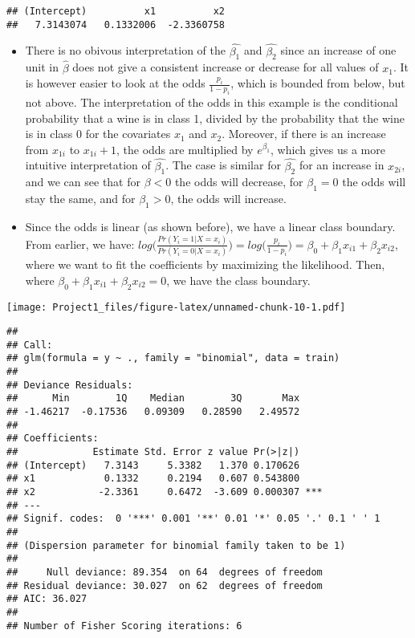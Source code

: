 \documentclass[]{article}
\begin{document}
\begin{verbatim}
## (Intercept)          x1          x2 
##   7.3143074   0.1332006  -2.3360758
\end{verbatim}

\begin{itemize}
\item
  There is no obivous interpretation of the \(\hat{\beta_1}\) and
  \(\hat{\beta_2}\) since an increase of one unit in \(\hat{\beta}\)
  does not give a consistent increase or decrease for all values of
  \(x_1\). It is however easier to look at the odds
  \(\frac{p_i}{1-p_i}\), which is bounded from below, but not above. The
  interpretation of the odds in this example is the conditional
  probability that a wine is in class 1, divided by the probability that
  the wine is in class 0 for the covariates \(x_1\) and \(x_2\).
  Moreover, if there is an increase from \(x_{1i}\) to \(x_{1i} + 1\),
  the odds are multiplied by \(e^{\beta_1}\), which gives us a more
  intuitive interpretation of \(\hat{\beta_1}\). The case is similar for
  \(\hat{\beta_2}\) for an increase in \(x_{2i}\), and we can see that
  for \(\beta < 0\) the odds will decrease, for \(\beta_1 = 0\) the odds
  will stay the same, and for \(\beta_1 >0\), the odds will increase.
\item
  Since the odds is linear (as shown before), we have a linear class
  boundary. From earlier, we have:
  \(log \bigg(\frac{Pr(Y_i=1|X=x_i)}{Pr(Y_i=0|X=x_i)} \bigg) = log \Big(\frac{p_i}{1-p_i}\Big) = \beta_0 + \beta_1 x_{i1} + \beta_2 x_{i2}\),
  where we want to fit the coefficients by maximizing the likelihood.
  Then, where \(\beta_0 + \beta_1 x_{i1} + \beta_2 x_{i2} = 0\), we have
  the class boundary.
\end{itemize}

\texttt{[image: Project1\_files/figure-latex/unnamed-chunk-10-1.pdf]}

\begin{verbatim}
## 
## Call:
## glm(formula = y ~ ., family = "binomial", data = train)
## 
## Deviance Residuals: 
##      Min        1Q    Median        3Q       Max  
## -1.46217  -0.17536   0.09309   0.28590   2.49572  
## 
## Coefficients:
##             Estimate Std. Error z value Pr(>|z|)    
## (Intercept)   7.3143     5.3382   1.370 0.170626    
## x1            0.1332     0.2194   0.607 0.543800    
## x2           -2.3361     0.6472  -3.609 0.000307 ***
## ---
## Signif. codes:  0 '***' 0.001 '**' 0.01 '*' 0.05 '.' 0.1 ' ' 1
## 
## (Dispersion parameter for binomial family taken to be 1)
## 
##     Null deviance: 89.354  on 64  degrees of freedom
## Residual deviance: 30.027  on 62  degrees of freedom
## AIC: 36.027
## 
## Number of Fisher Scoring iterations: 6
\end{verbatim}
\end{document}
